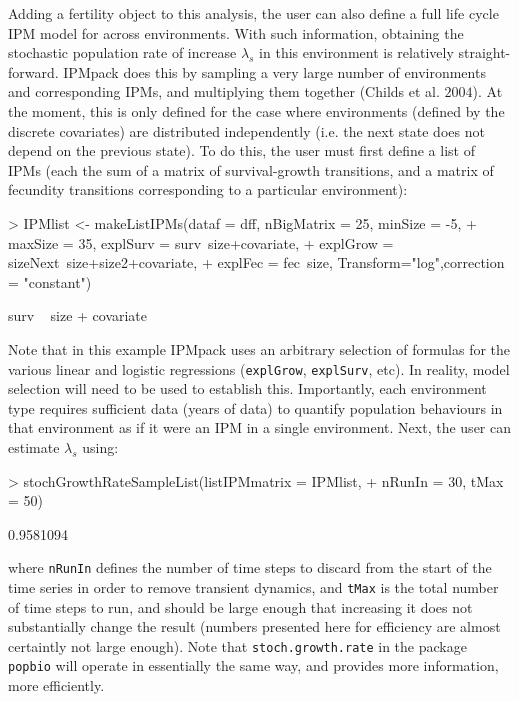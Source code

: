 \documentclass{article}
\begin{document}
Adding a fertility object to this analysis, the user can also define a full life
cycle IPM model for across environments. With such information, obtaining the stochastic population rate of increase $\lambda_s$ in this environment is relatively straight-forward. IPMpack does this by sampling a very large number of environments and corresponding IPMs, and multiplying them together (Childs et al. $2004$). At the moment, this is only defined for the case where environments (defined by the discrete covariates) are distributed independently (i.e. the next state does not depend on the previous state). To do this, the user must first define a list of IPMs (each the sum of a matrix of survival-growth transitions, and a matrix of fecundity transitions corresponding to a particular environment):
\begin{Schunk}
\begin{Sinput}
> IPMlist <- makeListIPMs(dataf = dff, nBigMatrix = 25, minSize = -5, 
+                         maxSize = 35, explSurv = surv~size+covariate, 
+                         explGrow = sizeNext~size+size2+covariate, 
+                         explFec = fec~size, Transform="log",correction = "constant")
\end{Sinput}
\begin{Soutput}
surv ~ size + covariate
\end{Soutput}
\end{Schunk}
Note that in this example IPMpack uses an arbitrary selection of
formulas for the various linear and logistic
regressions ({\tt explGrow}, {\tt explSurv}, etc). In reality,
model selection will need to be used to establish this. Importantly, each
environment type requires sufficient data (years of data) to quantify population
behaviours in that environment as if it were an IPM in a single environment.  
Next, the user can estimate $\lambda_s$ using:
\begin{Schunk}
\begin{Sinput}
> stochGrowthRateSampleList(listIPMmatrix = IPMlist, 
+                           nRunIn = 30, tMax = 50)
\end{Sinput}
\begin{Soutput}
[1] 0.9581094
\end{Soutput}
\end{Schunk}
where {\tt nRunIn} defines the number of time steps to discard from the start of the time series in order to remove transient dynamics, and {\tt tMax} is the total
number of time steps to run, and should be large enough that increasing it does not substantially change the result (numbers presented here for efficiency are almost certaintly not large enough). Note that {\tt stoch.growth.rate} in the package {\tt popbio} will operate in essentially the same way, and provides more information, more efficiently.  
\end{document}
